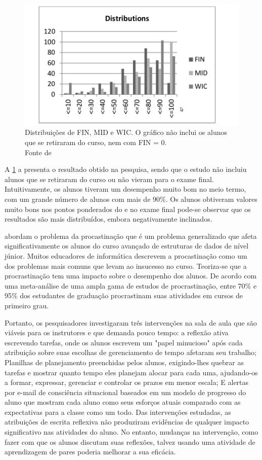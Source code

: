 \begin{figure}[h]
	\centering
	\captionsetup{justification=centering}
	\includegraphics[width=.8\linewidth]{imagens/cukierman.png}
	\caption{Distribuições de FIN, MID e WIC. O gráfico não inclui os alunos que se retiraram do curso, nem com FIN = 0. \\ Fonte de }
	\label{figura:resultadoCukierman}
\end{figure}

A \cref{figura:resultadoCukierman} a presenta o resultado obtido na pesquisa, sendo que o estudo não incluiu alunos que se retiraram do curso ou não vieram para o exame final. Intuitivamente, os alunos tiveram um desempenho muito bom no meio termo, com um grande número de alunos com mais de 90\%. Os alunos obtiveram valores muito bons nos pontos ponderados do  e no exame final pode-se observar que os resultados são mais distribuídos, embora negativamente inclinados.

 abordam o problema da procastinação que é um problema generalizado que afeta significativamente os alunos do curso avançado de estruturas de dados de nível júnior. Muitos educadores de informática descrevem a procastinação como um dos problemas mais comuns que levam ao insucesso no curso. Teoriza-se que a procrastinação tem uma impacto sobre o desempenho dos alunos. De acordo com uma meta-análise de uma ampla gama de estudos de procrastinação, entre 70\% e 95\% dos estudantes de graduação procrastinam suas atividades em cursos de primeiro grau. 

Portanto, os pesquisadores investigaram três intervenções na sala de aula que são viáveis para os instrutores e que demanda pouco tempo: a reflexão ativa escrevendo tarefas, onde os alunos escrevem um "papel minucioso" após cada atribuição sobre suas escolhas de gerenciamento de tempo afetaram seu trabalho; Planilhas de planejamento preenchidas pelos alunos, exigindo-lhes quebrar as tarefas e mostrar quanto tempo eles planejam alocar para cada uma,  ajudando-os a formar, expressar, gerenciar e controlar os prazos em menor escala; E alertas por e-mail de consciência situacional baseados em um modelo de progresso do aluno que mostram cada aluno como seus esforços atuais comparado com as expectativas para a classe como um todo. Das intervenções estudadas, as atribuições de escrita reflexiva não produziram evidências de qualquer impacto significativo nas atividades do aluno. No entanto, mudanças na intervenção, como fazer com que os alunos discutam suas reflexões, talvez usando uma atividade de aprendizagem de pares poderia melhorar a sua eficácia. 

